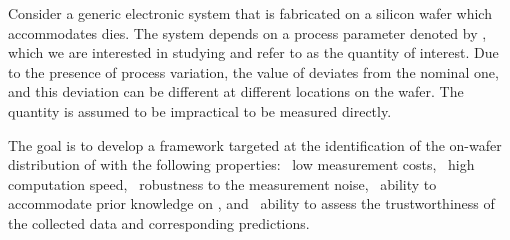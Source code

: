 Consider a generic electronic system that is fabricated on a silicon wafer which
accommodates \nd dies. The system depends on a process parameter denoted by \g,
which we are interested in studying and refer to as the quantity of interest.
Due to the presence of process variation, the value of \g deviates from the
nominal one, and this deviation can be different at different locations on the
wafer. The quantity is assumed to be impractical to be measured directly.

The goal is to develop a framework targeted at the identification of the
on-wafer distribution of \g with the following properties: \one~low measurement
costs, \two~high computation speed, \three~robustness to the measurement noise,
\four~ability to accommodate prior knowledge on \g, and \five~ability to assess
the trustworthiness of the collected data and corresponding predictions.
